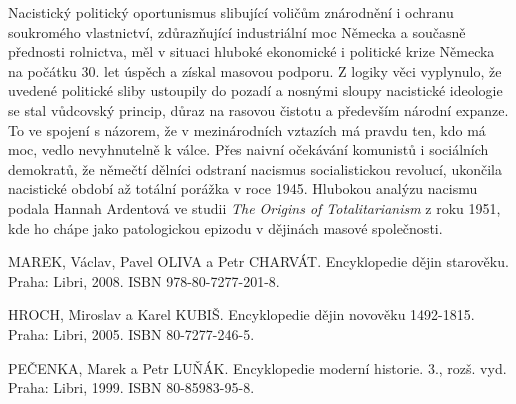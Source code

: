 \documentclass{article}
\begin{document}
  Nacistický politický oportunismus slibující voličům znárodnění i ochranu soukromého vlastnictví, zdůrazňující industriální moc Německa a současně přednosti rolnictva, měl v situaci hluboké ekonomické i politické krize Německa na počátku 30. let úspěch a získal masovou podporu. Z logiky věci vyplynulo, že uvedené politické sliby ustoupily do pozadí a nosnými sloupy nacistické ideologie se stal vůdcovský princip, důraz na rasovou čistotu a především národní expanze. To ve spojení s názorem, že v mezinárodních vztazích má pravdu ten, kdo má moc, vedlo nevyhnutelně k válce. Přes naivní očekávání komunistů i sociálních demokratů, že němečtí dělníci odstraní nacismus socialistickou revolucí, ukončila nacistické období až totální porážka v roce 1945. Hlubokou analýzu nacismu podala Hannah Ardentová ve studii {\it The Origins of Totalitarianism} z roku 1951, kde ho chápe jako patologickou epizodu v dějinách masové společnosti.


\begin{thebibliography}{9}

  MAREK, Václav, Pavel OLIVA a Petr CHARVÁT.
  Encyklopedie dějin starověku.
  Praha: Libri,
  2008.
  ISBN 978-80-7277-201-8.

  HROCH, Miroslav a Karel KUBIŠ.
  Encyklopedie dějin novověku 1492-1815.
  Praha: Libri,
  2005.
  ISBN 80-7277-246-5.

  PEČENKA, Marek a Petr LUŇÁK.
  Encyklopedie moderní historie. 3., rozš. vyd.
  Praha: Libri,
  1999.
  ISBN 80-85983-95-8.

\end{thebibliography}
\end{document}
